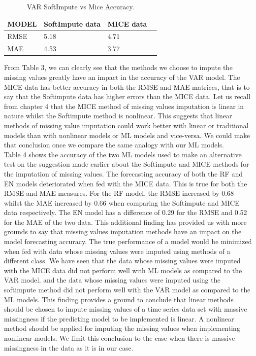 \documentclass[12pt,italian, twoside]{report}
\begin{document}
\begin{enumerate}
		  \begin{table}
		 	\centering
		 	\begin{tabular}{|l|l|l|l|}
		 		\hline
		 		MODEL & SoftImpute data & MICE data \\ \hline
		 		RMSE &    5.18              &  4.71      \\
		 		MAE &     4.53               & 3.77       \\  \hline
		 	\end{tabular}
		 	\caption{VAR SoftImpute vs Mice Accuracy.}
		 	\label{tab: VAR_soft_mice}
		 \end{table}
		From Table 3, we can clearly see that the methods we choose to impute the missing values greatly have an impact in the accuracy of the VAR model. The MICE data has better accuracy in both the RMSE and MAE matrices, that is to say that the Softimpute data has higher errors than the MICE data. Let us recall from chapter 4 that the MICE method of missing values imputation is linear in nature whilst the Softimpute method is nonlinear. This suggests that linear methods of missing value imputation could work better with linear or traditional models than with nonlinear models or ML models and vice-versa. We could make that conclusion once we compare the same analogy with our ML models.\\
		Table 4 shows the accuracy of the two ML models used to make an alternative test on the suggestion made earlier about the Softimpute and MICE methods for the imputation of missing values. The forecasting accuracy of both the RF and EN models deteriorated when fed with the MICE data. This is true for both the RMSE and MAE measures. For the RF model, the RMSE increased by 0.68 whilst the MAE increased by 0.66 when comparing the Softimpute and MICE data respectively. The EN model has a difference of 0.29 for the RMSE and 0.52 for the MAE of the two data. This additional finding has provided us with more grounds to say that missing values imputation methods have an impact on the model forecasting accuracy. The true performance of a model would be minimized when fed with data whose missing values were imputed using methods of a different class. We have seen that the data whose missing values were imputed with the MICE data did not perform well with ML models as compared to the VAR model, and the data whose missing values were imputed using the softimpute method did not perform well with the VAR model as compared to the ML models. This finding provides a ground to conclude that linear methods should be chosen to impute missing values of a time series data set with massive missingness if the predicting model to be implemented is linear. A nonlinear method should be applied for imputing the missing values when implementing nonlinear models. We limit this conclusion to the case when there is massive missingness in the data as it is in our case.

\end{enumerate}
\end{document}
